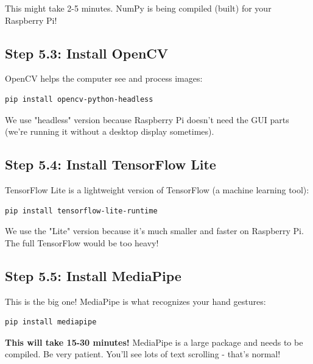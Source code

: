 \documentclass[12pt,a4paper]{article}
\begin{document}
\begin{tipbox}
This might take 2-5 minutes. NumPy is being compiled (built) for your Raspberry Pi!
\end{tipbox}

\subsection{Step 5.3: Install OpenCV}

OpenCV helps the computer see and process images:

\begin{lstlisting}
pip install opencv-python-headless
\end{lstlisting}

We use "headless" version because Raspberry Pi doesn't need the GUI parts (we're running it without a desktop display sometimes).

\subsection{Step 5.4: Install TensorFlow Lite}

TensorFlow Lite is a lightweight version of TensorFlow (a machine learning tool):

\begin{lstlisting}
pip install tensorflow-lite-runtime
\end{lstlisting}

\begin{infobox}
We use the "Lite" version because it's much smaller and faster on Raspberry Pi. The full TensorFlow would be too heavy!
\end{infobox}

\subsection{Step 5.5: Install MediaPipe}

This is the big one! MediaPipe is what recognizes your hand gestures:

\begin{lstlisting}
pip install mediapipe
\end{lstlisting}

\begin{warningbox}
\textbf{This will take 15-30 minutes!} MediaPipe is a large package and needs to be compiled. Be very patient. You'll see lots of text scrolling - that's normal!
\end{warningbox}
\end{document}
